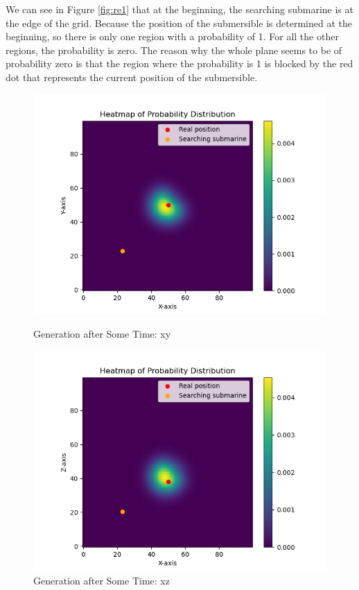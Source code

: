 \documentclass[12pt]{article}
\begin{document}
We can see in Figure \ref{fig:re1} that at the beginning, the searching submarine is at the edge of the grid. Because the position of the submersible is determined at the beginning, so there is only one region with a probability of 1. For all the other regions, the probability is zero. The reason why the whole plane seems to be of probability zero is that the region where the probability is 1 is blocked by the red dot that represents the current position of the submersible.
\begin{figure}[H]
  \begin{minipage}{0.5\textwidth} %
    \centering
    \includegraphics[width=\linewidth]{xy.png}
    \caption{Generation after Some Time: xy}
    \label{fig:re2}
  \end{minipage}
  \begin{minipage}{0.5\textwidth} %
    \centering
    \includegraphics[width=\linewidth]{xz.png}
    \caption{Generation after Some Time: xz}
    \label{fig:re2.5}
  \end{minipage}
\end{figure}
\end{document}

